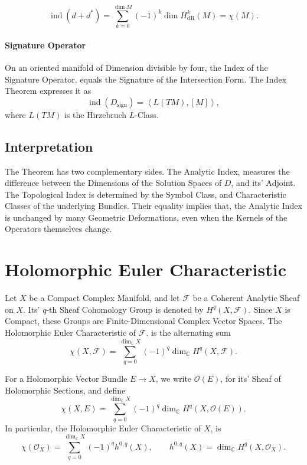 \documentclass[a4paper, 10pt, onepage]{elegantbook}
\begin{document}
{\begin{equation}
\operatorname{ind}(d+d^*)
=
\sum_{k=0}^{\dim M}(-1)^k\dim H^k_{\mathrm{dR}}(M)
=
\chi(M).
\end{equation}

\paragraph{Signature Operator}
On an oriented manifold of Dimension divisible by four, the Index of the Signature Operator, equals the Signature of 
the Intersection Form.
The Index Theorem expresses it as
\begin{equation}
\operatorname{ind}(D_{\mathrm{sign}})
=
\left\langle L(TM),[M]\right\rangle,
\end{equation}
where \(L(TM)\) is the Hirzebruch \(L\)-Class.

\subsection{Interpretation}

The Theorem has two complementary sides. The Analytic Index, measures the difference between the Dimensions of the 
Solution Spaces of \(D\), and its' Adjoint. The Topological Index is determined by the Symbol Class, and Characteristic 
Classes of the underlying Bundles. Their equality implies that, the Analytic Index is
unchanged by many Geometric Deformations, even when the Kernels of the Operators themselves change.

\section{Holomorphic Euler Characteristic}

Let \(X\) be a Compact Complex Manifold, and let \(\mathcal{F}\) be a Coherent Analytic Sheaf on \(X\). Its' \(q\)-th 
Sheaf Cohomology Group is
denoted by \(H^q(X,\mathcal{F})\). Since \(X\) is Compact, these Groups are Finite-Dimensional Complex Vector Spaces. 
The Holomorphic Euler Characteristic of
\(\mathcal{F}\). is the alternating sum
\begin{equation}
\chi(X,\mathcal{F})
=
\sum_{q=0}^{\dim_{\mathbb{C}}X}
(-1)^q\dim_{\mathbb{C}}H^q(X,\mathcal{F}).
\end{equation}

For a Holomorphic Vector Bundle \(E\to X\), we write \(\mathcal{O}(E)\), for its' Sheaf of Holomorphic Sections, and 
define
\begin{equation}
\chi(X,E)
=
\sum_{q=0}^{\dim_{\mathbb{C}}X}
(-1)^q\dim_{\mathbb{C}}H^q(X,\mathcal{O}(E)).
\end{equation}
In particular, the Holomorphic Euler Characteristic of \(X\), is
\begin{equation}
\chi(\mathcal{O}_X)
=
\sum_{q=0}^{\dim_{\mathbb{C}}X}
(-1)^q h^{0,q}(X),
\qquad
h^{0,q}(X)=\dim_{\mathbb{C}}H^q(X,\mathcal{O}_X).
\end{equation}

}
\end{document}
